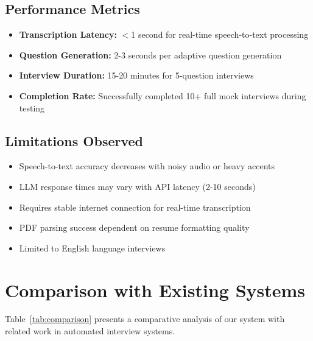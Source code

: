 \documentclass[conference]{IEEEtran}
\begin{document}
\subsection{Performance Metrics}
\begin{itemize}
\item \textbf{Transcription Latency:} $<$1 second for real-time speech-to-text processing
\item \textbf{Question Generation:} 2-3 seconds per adaptive question generation
\item \textbf{Interview Duration:} 15-20 minutes for 5-question interviews
\item \textbf{Completion Rate:} Successfully completed 10+ full mock interviews during testing
\end{itemize}

\subsection{Limitations Observed}
\begin{itemize}
\item Speech-to-text accuracy decreases with noisy audio or heavy accents
\item LLM response times may vary with API latency (2-10 seconds)
\item Requires stable internet connection for real-time transcription
\item PDF parsing success dependent on resume formatting quality
\item Limited to English language interviews
\end{itemize}

\section{Comparison with Existing Systems}

Table~\ref{tab:comparison} presents a comparative analysis of our system with related work in automated interview systems.
\end{document}
